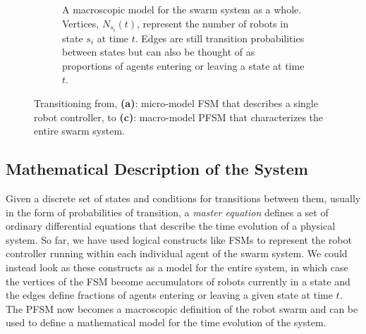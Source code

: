 \documentclass[Main.tex]{subfiles}
\begin{document}
\begin{figure}[!t]
\begin{subfigure}[t]{.4\textwidth}
	\caption{A macroscopic model for the swarm system as a whole. Vertices, $N_{s_i}(t)$, represent the number of robots in state $s_i$ at time $t$. Edges are still transition probabilities between states but can also be thought of as proportions of agents entering or leaving a state at time $t$.}\label{fig:pfsmmacro}
	\end{subfigure}
\caption{Transitioning from, \textbf{(a)}: micro-model FSM that describes a single robot controller, to \textbf{(c)}: macro-model PFSM that characterizes the entire swarm system.}\label{fig:allfsm}
\end{figure}

\subsection{Mathematical Description of the System}
Given a discrete set of states and conditions for transitions between them, usually in the form of probabilities of transition, a \emph{master equation} defines a set of ordinary differential equations that describe the time evolution of a physical system. So far, we have used logical constructs like FSMs to represent the robot controller running within each individual agent of the swarm system. We could instead look as these constructs as a model for the entire system, in which case the vertices of the FSM become accumulators of robots currently in a state and the edges define fractions of agents entering or leaving a given state at time $t$. The PFSM now becomes a macroscopic definition of the robot swarm and can be used to define a mathematical model for the time evolution of the system.
\end{document}
